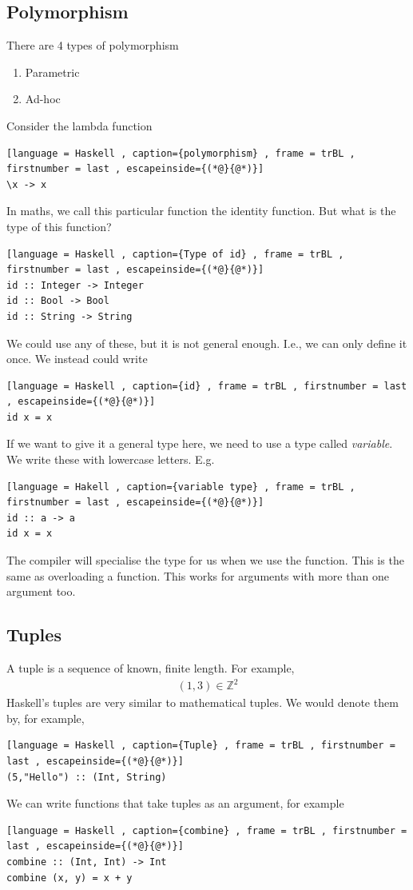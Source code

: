 \documentclass[a4paper]{article}
\theoremstyle{plain}
\theoremstyle{definition}
\theoremstyle{remark}
\begin{document}
\subsection{Polymorphism}
There are 4 types of polymorphism
\begin{enumerate}
	\item Parametric
	\item Ad-hoc
\end{enumerate}
Consider the lambda function
\begin{lstlisting}[language = Haskell , caption={polymorphism} , frame = trBL , firstnumber = last , escapeinside={(*@}{@*)}]
\x -> x
\end{lstlisting}
In maths, we call this particular function the identity function. But what is the type of this function?
\begin{lstlisting}[language = Haskell , caption={Type of id} , frame = trBL , firstnumber = last , escapeinside={(*@}{@*)}]
id :: Integer -> Integer
id :: Bool -> Bool
id :: String -> String
\end{lstlisting}
We could use any of these, but it is not general enough. I.e., we can only define it once. We instead could write
\begin{lstlisting}[language = Haskell , caption={id} , frame = trBL , firstnumber = last , escapeinside={(*@}{@*)}]
id x = x
\end{lstlisting}
If we want to give it a general type here, we need to use a type called \textit{variable}. We write these with lowercase letters. E.g.
\begin{lstlisting}[language = Hakell , caption={variable type} , frame = trBL , firstnumber = last , escapeinside={(*@}{@*)}]
id :: a -> a
id x = x
\end{lstlisting}
The compiler will specialise the type for us when we use the function. This is the same as overloading a function. This works for arguments with more than one argument too.
\subsection{Tuples}
A tuple is a sequence of known, finite length. For example,
\begin{align*}
	(1,3) \in \mathbb{Z}^2
\end{align*}
Haskell's tuples are very similar to mathematical tuples. We would denote them by, for example,
\begin{lstlisting}[language = Haskell , caption={Tuple} , frame = trBL , firstnumber = last , escapeinside={(*@}{@*)}]
(5,"Hello") :: (Int, String)
\end{lstlisting}
We can write functions that take tuples as an argument, for example
\begin{lstlisting}[language = Haskell , caption={combine} , frame = trBL , firstnumber = last , escapeinside={(*@}{@*)}]
combine :: (Int, Int) -> Int
combine (x, y) = x + y
\end{lstlisting}
\end{document}
